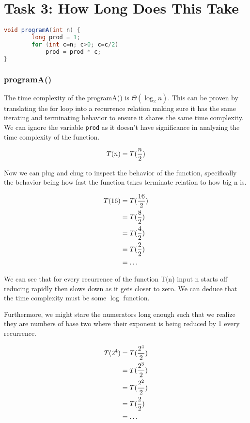 \chapter{Task 3: How Long Does This Take}
\begin{lstlisting}[language=Java] 
void programA(int n) {
        long prod = 1;
        for (int c=n; c>0; c=c/2)
            prod = prod * c;
}
\end{lstlisting}



\subsection*{programA()}
The time complexity of the programA() is $\Theta(\log_2n)$. This can be proven by translating the for loop into a recurrence relation making sure it has the same iterating and terminating behavior to ensure it shares the same time complexity. We can ignore the variable \texttt{prod} as it doesn't have significance in analyzing the time complexity of the function.

$$
T(n) = T( {n \over 2} )
$$

Now we can plug and chug to inspect the behavior of the function, specifically the behavior being how fast the function takes terminate relation to how big n is.

\begin{align*}
T(16) &= T( {16 \over 2} ) \\
&= T( {8 \over 2} ) \\
&= T( {4 \over 2} ) \\
&= T( {2 \over 2} ) \\
&= \ldots  \\
\end{align*}

We can see that for every recurrence of the function T(n) input n starts off reducing rapidly then slows down as it gets closer to zero. We can deduce that the time complexity must be some $\log$ function.

\pagebreak

Furthermore, we might stare the numerators long enough such that we realize they are numbers of base two where their exponent is being reduced by 1 every recurrence.

\begin{align*}
    T(2^4) &= T( {2^4 \over 2} ) \\
    &= T( {2^3 \over 2} ) \\
    &= T( {2^2 \over 2} ) \\
    &= T( {2 \over 2} ) \\
    &= \ldots  \\
    \end{align*}

